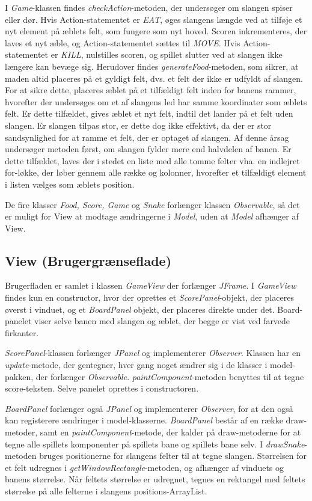 \documentclass{report}
\begin{document}
I \textit{Game}-klassen findes \textit{checkAction}-metoden, der undersøger om slangen spiser eller dør. Hvis Action-statementet er \textit{EAT}, øges slangens længde ved at tilføje et nyt element på æblets felt, som fungere som nyt hoved. Scoren inkrementeres, der laves et nyt æble, og Action-statementet sættes til \textit{MOVE}.
Hvis Action-statementet er \textit{KILL}, nulstilles scoren, og spillet slutter ved at slangen ikke længere kan bevæge sig.
Herudover findes \textit{generateFood}-metoden, som sikrer, at maden altid placeres på et gyldigt felt, dvs. et felt der ikke er udfyldt af slangen. For at sikre dette, placeres æblet på et tilfældigt felt inden for banens rammer, hvorefter der undersøges om et af slangens led har samme koordinater som æblets felt. Er dette tilfældet, gives æblet et nyt felt, indtil det lander på et felt uden slangen. Er slangen tilpas stor, er dette dog ikke effektivt, da der er stor sandsynlighed for at ramme et felt, der er optaget af slangen. Af denne årsag undersøger metoden først, om slangen fylder mere end halvdelen af banen. Er dette tilfældet, laves der i stedet en liste med alle tomme felter vha. en indlejret for-løkke, der løber gennem alle række og kolonner, hvorefter et tilfældigt element i listen vælges som æblets position.

De fire klasser \textit{Food, Score, Game} og \textit{Snake} forlænger klassen \textit{Observable}, så det er muligt for View at modtage ændringerne i \textit{Model}, uden at \textit{Model} afhænger af View.

\subsection{View (Brugergrænseflade)}
Brugerfladen er samlet i klassen \textit{GameView} der forlænger \textit{JFrame}. I \textit{GameView} findes kun en constructor, hvor der oprettes et \textit{ScorePanel}-objekt, der placeres øverst i vinduet, og et \textit{BoardPanel} objekt, der placeres direkte under det. Board-panelet viser selve banen med slangen og æblet, der begge er vist ved farvede firkanter. 

\textit{ScorePanel}-klassen forlænger \textit{JPanel} og implementerer \textit{Observer}. Klassen har en \textit{update}-metode, der gentegner, hver gang noget ændrer sig i de klasser i model-pakken, der forlænger \textit{Observable}. 
\textit{paintComponent}-metoden benyttes til at tegne score-teksten. Selve panelet oprettes i constructoren.

\textit{BoardPanel} forlænger også \textit{JPanel} og implementerer \textit{Observer}, for at den også kan registerere ændringer i model-klasserne. \textit{BoardPanel} består af en række draw-metoder, samt en \textit{paintComponent}-metode, der kalder på draw-metoderne for at tegne alle spillets komponenter på spillets bane og spillets bane selv.
I \textit{drawSnake}-metoden bruges positionerne for slangens felter til at tegne slangen. Størrelsen for et felt udregnes i \textit{getWindowRectangle}-metoden, og afhænger af vinduets og banens størrelse. Når feltets størrelse er udregnet, tegnes en rektangel med feltets størrelse på alle felterne i slangens positions-ArrayList.
\end{document}
